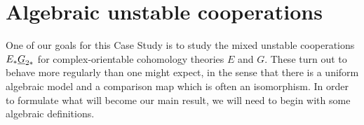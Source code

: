 











\section{Algebraic unstable cooperations}

One of our goals for this Case Study is to study the mixed unstable cooperations $E_* \underline{\smash{G}}_{2*}$ for complex-orientable cohomology theories $E$ and $G$.  These turn out to behave more regularly than one might expect, in the sense that there is a uniform algebraic model and a comparison map which is often an isomorphism.  In order to formulate what will become our main result, we will need to begin with some algebraic definitions.

